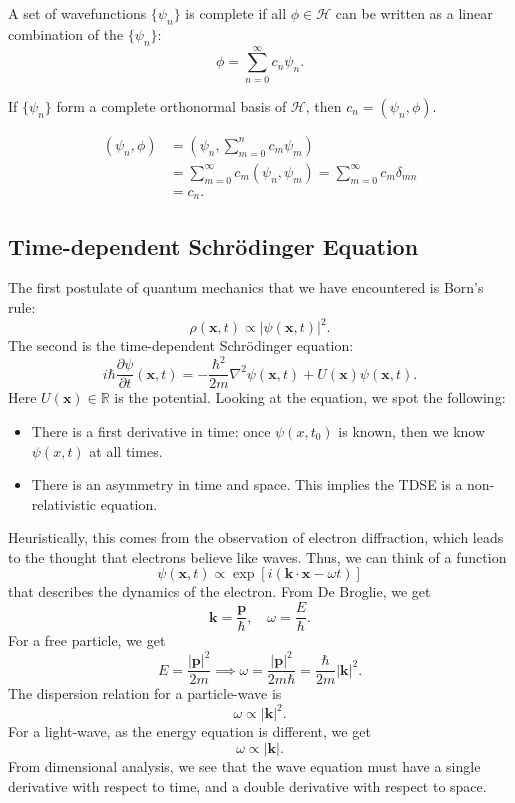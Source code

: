 \documentclass[12pt]{article}
\begin{document}
\begin{definition}
	A set of wavefunctions $\{\psi_n\}$ is complete if all $\phi \in \mathcal{H}$ can be written as a linear combination of the $\{\psi_n\}$:
	\[
	\phi = \sum_{n = 0}^{\infty}c_n \psi_n
	.\]
\end{definition}

\begin{lemma}
	If $\{\psi_n\}$ form a complete orthonormal basis of $\mathcal{H}$, then $c_n = (\psi_n, \phi)$.
\end{lemma}

\begin{proofbox}	
\begin{align*}
	(\psi_n, \phi) &= \left( \psi_n, \sum_{m = 0}^{n} c_m \psi_m \right) \\
		       &= \sum_{m = 0}^{\infty} c_m (\psi_n, \psi_m) = \sum_{m = 0}^{\infty} c_m \delta_{mn} \\
		       &= c_n.
\end{align*}
\end{proofbox}


\subsection{Time-dependent Schr\"{o}dinger Equation}%
\label{sub:time_dependent_schrodinger_equation}

The first postulate of quantum mechanics that we have encountered is Born's rule:
\[
	\rho(\mathbf{x}, t) \propto |\psi(\mathbf{x}, t)|^2
.\]
The second is the time-dependent Schr\"{o}dinger equation:
\[
	i \hbar \frac{\partial \psi}{\partial t} (\mathbf{x}, t) = - \frac{\hbar^2}{2m} \nabla^2 \psi(\mathbf{x}, t) + U(\mathbf{x}) \psi(\mathbf{x}, t)
.\] 
Here $U(\mathbf{x}) \in \mathbb{R}$ is the potential. Looking at the equation, we spot the following:
\begin{itemize}
	\item There is a first derivative in time: once $\psi(x, t_0)$ is known, then we know $\psi(x, t)$ at all times.
	\item There is an asymmetry in time and space. This implies the TDSE is a non-relativistic equation.
\end{itemize}

Heuristically, this comes from the observation of electron diffraction, which leads to the thought that electrons believe like waves. Thus, we can think of a function
\[
	\psi(\mathbf{x}, t) \propto \exp[i(\mathbf{k} \cdot \mathbf{x} - \omega t)]
\]
that describes the dynamics of the electron. From De Broglie, we get
\[
\mathbf{k} = \frac{\mathbf{p}}{\hbar}, \quad \omega = \frac{E}{\hbar}
.\]
For a free particle, we get
\[
E = \frac{|\mathbf{p}|^2}{2m} \implies \omega = \frac{|\mathbf{p}|^2}{2 m \hbar} = \frac{\hbar}{2m} |\mathbf{k}|^2
.\]
The dispersion relation for a particle-wave is
\[
\omega \propto |\mathbf{k}|^2
.\]
For a light-wave, as the energy equation is different, we get
\[
\omega \propto |\mathbf{k}|
.\]
From dimensional analysis, we see that the wave equation must have a single derivative with respect to time, and a double derivative with respect to space.
\end{document}
